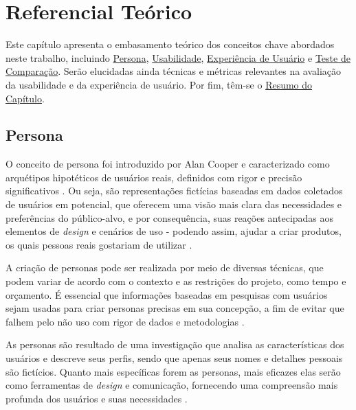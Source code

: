 \chapter[Referencial Teórico]{Referencial Teórico}
\label{chap:Referencial}

Este capítulo apresenta o embasamento teórico dos conceitos chave abordados
neste trabalho, incluindo \hyperref[sec:Persona]{Persona}, \hyperref[sec:Usabilidade]
{Usabilidade}, \hyperref[sec:Experiência de Usuário]{Experiência de Usuário} e 
\hyperref[sec:Teste de Comparação]{Teste de Comparação}. 
Serão elucidadas ainda técnicas e métricas relevantes na avaliação da usabilidade e 
da experiência de usuário. Por fim, têm-se o \hyperref[sec:Resumo do Capítulo]{Resumo do Capítulo}.

\section{Persona}
\label{sec:Persona}

O conceito de persona foi introduzido por Alan Cooper e caracterizado como 
arquétipos hipotéticos de usuários reais, definidos com rigor e precisão 
significativos \cite{cooper1999}. Ou seja, são representações fictícias 
baseadas em dados coletados de usuários em potencial, que oferecem uma visão 
mais clara das necessidades e preferências do público-alvo, e por consequência, 
suas reações antecipadas aos elementos de \textit{design} e cenários de uso - podendo 
assim, ajudar a criar produtos, os quais pessoas reais gostariam de utilizar 
\cite{pruitt2006}.

A criação de personas pode ser realizada por meio de diversas técnicas, que 
podem variar de acordo com o contexto e as restrições do projeto, como tempo e 
orçamento. É essencial que informações baseadas em pesquisas com usuários sejam 
usadas para criar personas precisas em sua concepção, a fim de evitar que falhem 
pelo não uso com rigor de dados e metodologias \cite{pruitt2006}.

As personas são resultado de uma investigação que analisa as características dos 
usuários e descreve seus perfis, sendo que apenas seus nomes e detalhes pessoais 
são fictícios. Quanto mais específicas forem as personas, mais eficazes elas serão 
como ferramentas de \textit{design} e comunicação, fornecendo uma compreensão mais profunda 
dos usuários e suas necessidades \cite{barbosa2010}.

